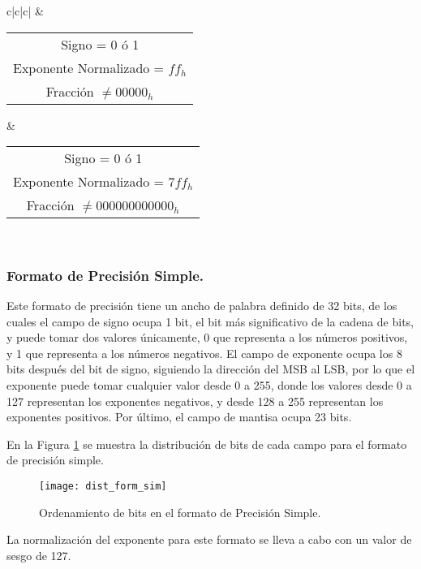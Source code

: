 \begin{table}[htb]
\begin{tabular}{c|c|c|}
 & \begin{tabular}[c]{@{}c@{}}Signo = 0 ó 1\\ Exponente Normalizado = $ff_{h}$\\  Fracción $\neq 00000_{h}$\end{tabular}                           & \begin{tabular}[c]{@{}c@{}}Signo = 0 ó 1\\ Exponente Normalizado = $7ff_{h}$ \\ Fracción $\neq 000000000000_{h}$\end{tabular}                   \\ \hline
\end{tabular}
\end{table}


\subsubsection{Formato de Precisión Simple.}

Este formato de precisión tiene un ancho de palabra definido de 32 bits, de los cuales el campo de signo ocupa 1 bit, el bit más significativo de la cadena de bits, y puede tomar dos valores únicamente, 0 que representa a los números positivos, y 1 que representa a los números negativos. El campo de exponente ocupa los 8 bits después del bit de signo, siguiendo la dirección del MSB al LSB, por lo que el exponente puede tomar cualquier valor desde 0 a 255, donde los valores desde 0 a 127 representan los exponentes negativos, y desde 128 a 255 representan los exponentes positivos. Por último, el campo de mantisa ocupa 23 bits.

En la Figura \ref{fig:dist_form_sim} se muestra la distribución de bits de cada campo para el formato de precisión simple.

\begin{figure}[htb]
  \centering
  \texttt{[image: dist\_form\_sim]}
  \caption{Ordenamiento de bits en el formato de Precisión Simple.}
  \label{fig:dist_form_sim}
\end{figure}

La normalización del exponente para este formato se lleva a cabo con un valor de sesgo de 127.


